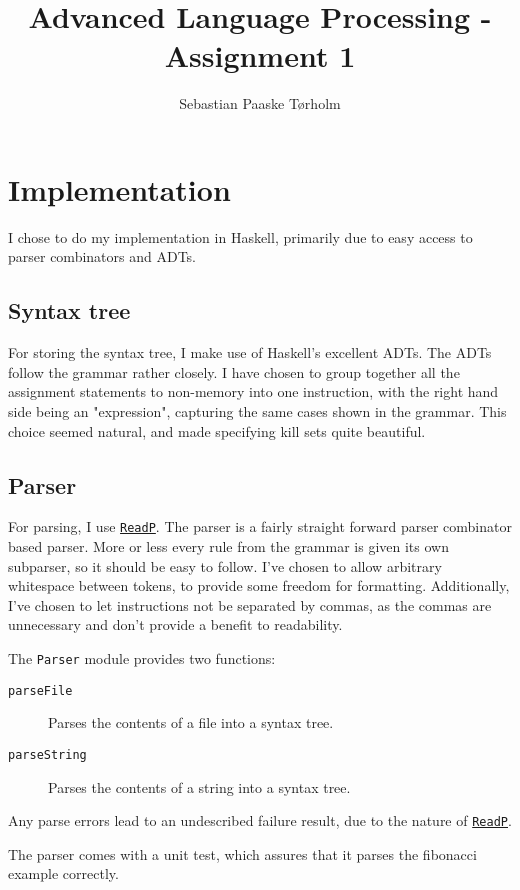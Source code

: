 \documentclass[11pt,a4paper]{article}
\title{Advanced Language Processing - Assignment 1}
\author{Sebastian Paaske Tørholm}
\newcommand{\hoogle}[1]{\href{http://www.haskell.org/hoogle/?hoogle=#1}{\texttt{#1}}}
\begin{document}
\maketitle

\section{Implementation}

I chose to do my implementation in Haskell, primarily due to easy access to
parser combinators and ADTs.

\subsection{Syntax tree}

For storing the syntax tree, I make use of Haskell's excellent ADTs. The ADTs
follow the grammar rather closely. I have chosen to group together all the
assignment statements to non-memory into one instruction, with the right hand
side being an "expression", capturing the same cases shown in the grammar. This
choice seemed natural, and made specifying kill sets quite beautiful.

\subsection{Parser}

For parsing, I use \hoogle{ReadP}. The parser is a fairly straight forward
parser combinator based parser. More or less every rule from the grammar is
given its own subparser, so it should be easy to follow. I've chosen to allow
arbitrary whitespace between tokens, to provide some freedom for formatting.
Additionally, I've chosen to let instructions not be separated by commas, as
the commas are unnecessary and don't provide a benefit to readability.

The \texttt{Parser} module provides two functions: 

\begin{description}
    \item[\texttt{parseFile}] Parses the contents of a file into a syntax tree.
    \item[\texttt{parseString}] Parses the contents of a string into a syntax tree.
\end{description}

Any parse errors lead to an undescribed failure result, due to the nature of
\hoogle{ReadP}.

The parser comes with a unit test, which assures that it parses the fibonacci
example correctly.
\end{document}

